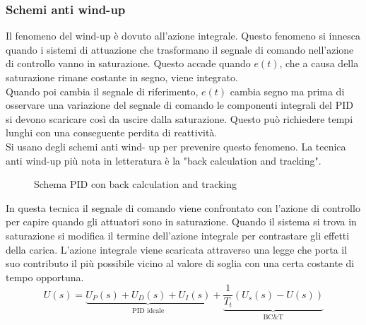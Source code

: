 \subsubsection{Schemi anti wind-up}
Il fenomeno del wind-up è dovuto all’azione integrale. Questo fenomeno si innesca quando i sistemi di attuazione che trasformano il segnale di comando nell’azione di controllo vanno in saturazione. Questo accade quando $e(t)$, che a causa della saturazione  rimane costante in segno, viene integrato.\\
Quando poi cambia il segnale di riferimento, $e(t)$ cambia segno ma prima di osservare una variazione del segnale di comando le componenti integrali del PID si devono scaricare così da uscire dalla saturazione. Questo può richiedere tempi lunghi con una conseguente perdita di reattività. \\
Si usano degli schemi anti wind- up per prevenire questo fenomeno. La tecnica anti wind-up più nota in letteratura  è la  "back calculation and tracking". \\
    \begin{figure} [H]
    \centering
    \fontsize{8}{10}\selectfont
    
    \caption{Schema PID con back calculation and tracking}
    \label{img:antiwindup}
\end{figure}
\noindent
In questa tecnica il segnale di comando viene confrontato con l'azione di controllo per capire quando gli attuatori sono in saturazione. Quando il sistema si trova in saturazione si modifica il termine dell'azione integrale per contrastare gli effetti della carica. L'azione integrale viene scaricata attraverso una legge che porta il suo contributo il più possibile vicino al valore di soglia con una certa costante di tempo opportuna.
\begin{equation}
U(s)=\underbrace{U_P(s)+U_D(s)+U_I(s)}_\text{PID ideale}+\underbrace{\frac{1}{T_t}(U_s(s)-U(s))}_\text{BC\&T}
\end{equation}
